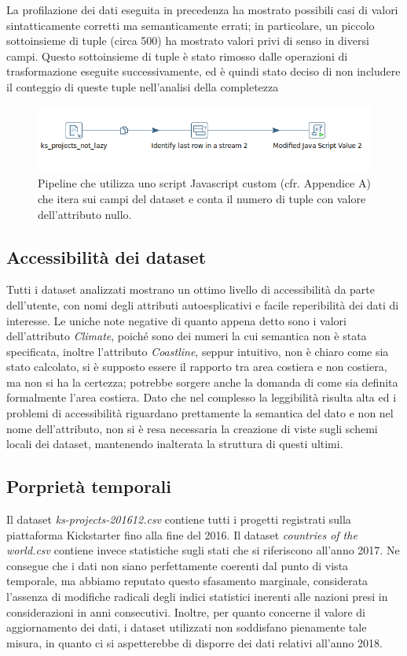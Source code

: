La profilazione dei dati eseguita in precedenza ha mostrato possibili casi di valori sintatticamente corretti ma semanticamente errati; in particolare, un piccolo sottoinsieme di tuple (circa 500) ha mostrato valori privi di senso in diversi campi. Questo sottoinsieme di tuple è stato rimosso dalle operazioni di trasformazione eseguite successivamente, ed è quindi stato deciso di non includere il conteggio di queste tuple nell'analisi della completezza

\begin{figure}
	\centering
	\includegraphics[width=0.7\linewidth]{images/DQ_completezza}
	\caption{Pipeline che utilizza uno script Javascript custom (cfr. Appendice A) che itera sui campi del dataset e conta il numero di tuple con valore dell'attributo nullo.}
	\label{fig:dqcompletezza}
\end{figure}

\subsection{Accessibilità dei dataset}
Tutti i dataset analizzati mostrano un ottimo livello di accessibilità da parte dell'utente, con nomi degli attributi autoesplicativi e facile reperibilità dei dati di interesse. 
Le uniche note negative di quanto appena detto sono i valori dell'attributo \textit{Climate}, poiché sono dei numeri la cui semantica non è stata specificata, inoltre l'attributo \textit{Coastline}, seppur intuitivo, non è chiaro come sia stato calcolato, si è supposto essere il rapporto tra area costiera e non costiera, ma non si ha la certezza; potrebbe sorgere anche la domanda di come sia definita formalmente l'area costiera.
Dato che nel complesso la leggibilità risulta alta ed i problemi di accessibilità riguardano prettamente la semantica del dato e non nel nome dell'attributo, non si è resa necessaria la creazione di viste sugli schemi locali dei dataset, mantenendo inalterata la struttura di questi ultimi.

\subsection{Porprietà temporali}
\label{subsec:temporali}
Il dataset \textit{ks-projects-201612.csv} contiene tutti i progetti registrati sulla piattaforma Kickstarter fino alla fine del 2016. Il dataset \textit{countries of the world.csv} contiene invece statistiche sugli stati che si riferiscono all'anno 2017. Ne consegue che i dati non siano perfettamente coerenti dal punto di vista temporale, ma abbiamo reputato questo sfasamento marginale, considerata l'assenza di modifiche radicali degli indici statistici inerenti alle nazioni presi in considerazioni in anni consecutivi.
Inoltre, per quanto concerne il valore di aggiornamento dei dati, i dataset utilizzati non soddisfano pienamente tale misura, in quanto ci si aspetterebbe di disporre dei dati relativi all'anno 2018.

